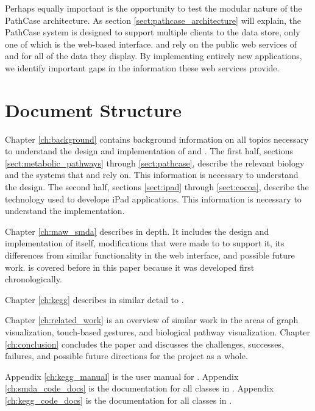 Perhaps equally important is the opportunity to test the modular nature of the
PathCase architecture. As section \ref{sect:pathcase_architecture} will explain,
the PathCase system is designed to support multiple clients to the data store,
only one of which is the web-based interface. \keggapp and \mawapp rely on the
public web services of \pathcasekegg and \pathcasemaw for all of the data they
display. By implementing entirely new applications, we identify important gaps
in the information these web services provide.

\section{Document Structure}

Chapter \ref{ch:background} contains background information on all topics
necessary to understand the design and implementation of \keggapp and \mawapp.
The first half, sections \ref{sect:metabolic_pathways} through
\ref{sect:pathcase}, describe the relevant biology and the systems that \keggapp
and \mawapp rely on. This information is necessary to understand the design. The
second half, sections \ref{sect:ipad} through \ref{sect:cocoa}, describe the
technology used to develope iPad applications. This information is necessary to
understand the implementation.

Chapter \ref{ch:maw_smda} describes \mawapp in depth. It includes the design and
implementation of \mawapp itself, modifications that were made to \pathcasemaw
to support it, its differences from similar functionality in the \pathcasemaw
web interface, and possible future work. \mawapp is covered before \keggapp
in this paper because it was developed first chronologically.

Chapter \ref{ch:kegg} describes \keggapp in similar detail to \mawapp.

Chapter \ref{ch:related_work} is an overview of similar work in the areas of
graph visualization, touch-based gestures, and biological pathway visualization.
Chapter \ref{ch:conclusion} concludes the paper and discusses the challenges,
successes, failures, and possible future directions for the project as a whole.

Appendix \ref{ch:kegg_manual} is the user manual for \keggapp. Appendix
\ref{ch:smda_code_docs} is the documentation for all classes in \mawapp.
Appendix \ref{ch:kegg_code_docs} is the documentation for all classes in
\keggapp.
